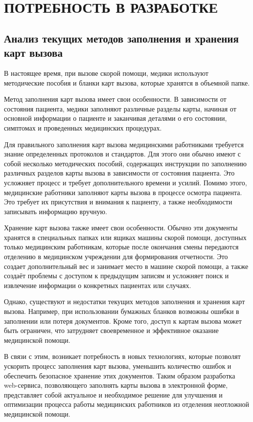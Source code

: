 \section{ПОТРЕБНОСТЬ В РАЗРАБОТКЕ}

\subsection{Анализ текущих методов заполнения и хранения карт вызова}

В настоящее время, при вызове скорой помощи, медики используют методические пособия и бланки карт вызова, которые хранятся в объемной папке.

Метод заполнения карт вызова имеет свои особенности. В зависимости от состояния пациента, медики заполняют различные разделы карты, начиная от основной информации о пациенте и заканчивая деталями о его состоянии, симптомах и проведенных медицинских процедурах.

Для правильного заполнения карт вызова медицинскими работниками требуется знание определенных протоколов и стандартов. Для этого они обычно имеют с собой несколько методических пособий, содержащих инструкции по заполнению различных разделов карты вызова в зависимости от состояния пациента. Это усложняет процесс и требует дополнительного времени и усилий. Помимо этого, медицинские работники заполняют карты вызова в процессе осмотра пациента. Это требует их присутствия и внимания к пациенту, а также необходимости записывать информацию вручную.

Хранение карт вызова также имеет свои особенности. Обычно эти документы хранятся в специальных папках или ящиках машины скорой помощи, доступных только медицинским работникам, которые после окончания смены передаются отделению в медицинском учреждении для формирования отчетности. Это создает дополнительный вес и занимает место в машине скорой помощи, а также создаёт проблемы с доступом к предыдущим записям и усложняет поиск и извлечение информации о конкретных пациентах или случаях. 

Однако, существуют и недостатки текущих методов заполнения и хранения карт вызова. Например, при использовании бумажных бланков возможны ошибки в заполнении или потеря документов. Кроме того, доступ к картам вызова может быть ограничен, что затрудняет своевременное и эффективное оказание медицинской помощи.

В связи с этим, возникает потребность в новых технологиях, которые позволят ускорить процесс заполнения карт вызова, уменьшить количество ошибок и обеспечить безопасное хранение этих документов. Таким образом разработка web-сервиса, позволяющего заполнять карты вызова в электронной форме, представляет собой актуальное и необходимое решение для улучшения и оптимизации процесса работы медицинских работников из отделения неотложной медицинской помощи.

